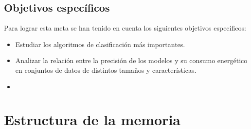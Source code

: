\subsection{Objetivos específicos}
\label{sec:objetivos-especificos}

Para lograr esta meta se han tenido en cuenta los siguientes objetivos específicos:

    \begin{itemize}
        \item Estudiar los algoritmos de clasificación más importantes.
        \item Analizar la relación entre la precisión de los modelos y su consumo energético en conjuntos de datos de distintos tamaños y características.
        \item {}
    \end{itemize}



\section{Estructura de la memoria}
\label{sec:estructura}


